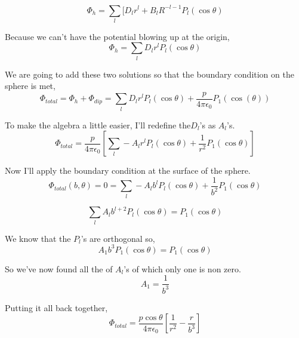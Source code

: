 \documentclass[10pt,a4paper]{article}
\begin{document}
\begin{equation}
\Phi_h=\sum_l[D_lr^l+B_lR^{-l-1}P_l(\cos\theta)
\end{equation}

Because we can't have the potential blowing up at the origin,
\begin{equation}
\Phi_h=\sum_lD_lr^lP_l(\cos\theta)
\end{equation}

We are going to add these two solutions so that the boundary condition on the sphere is met,
\begin{equation}
\Phi_{total}=\Phi_h+\Phi_{dip}=\sum_lD_lr^lP_l(\cos\theta)+\frac{p}{4\pi\epsilon_0}P_1(\cos(\theta))
\end{equation} 

To make the algebra a little easier, I'll redefine the$D_l$'s as $A_l$'s.
\begin{equation}
\Phi_{total}=\frac{p}{4\pi\epsilon_0}\left[\sum_l-A_lr^lP_l(\cos\theta)+\frac{1}{r^2}P_1(\cos\theta)\right]
\end{equation}

Now I'll apply the boundary condition at the surface of the sphere.
\begin{equation}
\Phi_{total}(b,\theta)=0=\sum_l-A_lb^lP_l(\cos\theta)+\frac{1}{b^2}P_1(\cos\theta)
\end{equation}

\begin{equation}
\sum_l A_l b^{l+2}P_l(\cos\theta)=P_1(\cos\theta)
\end{equation}

We know that the $P_l$'s are orthogonal so,
\begin{equation}
A_1 b^3 P_1(\cos\theta)=P_1(\cos\theta)
\end{equation}

So we've now found all the of $A_l$'s of which only one is non zero.
\begin{equation}
A_1=\frac{1}{b^3}
\end{equation}

Putting it all back together,
\begin{equation}
\boxed{\Phi_{total}=\frac{p\cos\theta}{4\pi\epsilon_0}\left[\frac{1}{r^2}-\frac{r}{b^3}\right]}
\end{equation}
\end{document}
